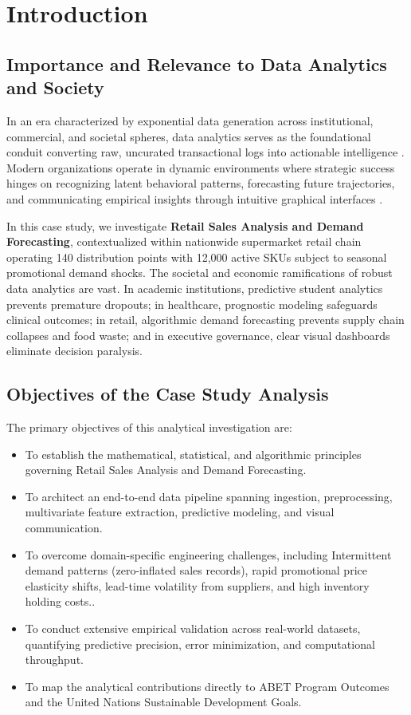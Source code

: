 \section{Introduction}

\subsection{Importance and Relevance to Data Analytics and Society}
In an era characterized by exponential data generation across institutional, commercial, and societal spheres, data analytics serves as the foundational conduit converting raw, uncurated transactional logs into actionable intelligence \cite{provost2013data}. Modern organizations operate in dynamic environments where strategic success hinges on recognizing latent behavioral patterns, forecasting future trajectories, and communicating empirical insights through intuitive graphical interfaces \cite{han2011data}.

In this case study, we investigate \textbf{Retail Sales Analysis and Demand Forecasting}, contextualized within nationwide supermarket retail chain operating 140 distribution points with 12,000 active SKUs subject to seasonal promotional demand shocks. The societal and economic ramifications of robust data analytics are vast. In academic institutions, predictive student analytics prevents premature dropouts; in healthcare, prognostic modeling safeguards clinical outcomes; in retail, algorithmic demand forecasting prevents supply chain collapses and food waste; and in executive governance, clear visual dashboards eliminate decision paralysis.

\subsection{Objectives of the Case Study Analysis}
The primary objectives of this analytical investigation are:
\begin{itemize}
  \item To establish the mathematical, statistical, and algorithmic principles governing Retail Sales Analysis and Demand Forecasting.
  \item To architect an end-to-end data pipeline spanning ingestion, preprocessing, multivariate feature extraction, predictive modeling, and visual communication.
  \item To overcome domain-specific engineering challenges, including Intermittent demand patterns (zero-inflated sales records), rapid promotional price elasticity shifts, lead-time volatility from suppliers, and high inventory holding costs..
  \item To conduct extensive empirical validation across real-world datasets, quantifying predictive precision, error minimization, and computational throughput.
  \item To map the analytical contributions directly to ABET Program Outcomes and the United Nations Sustainable Development Goals.
\end{itemize}
